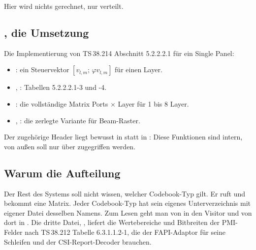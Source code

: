 Hier wird nichts gerechnet, nur verteilt.

\subsection{, die Umsetzung}

Die Implementierung von TS\,38.214 Abschnitt 5.2.2.2.1 für ein Single Panel:
\begin{itemize}
  \item {}: ein Steuervektor $[v_{l,m};\,\varphi v_{l,m}]$ für einen Layer.
  \item {}, : Tabellen 5.2.2.2.1-3 und -4.
  \item {}: die vollständige Matrix Ports $\times$ Layer für 1 bis 8 Layer.
  \item {}, : die zerlegte Variante für Beam-Raster.
\end{itemize}

Der zugehörige Header  liegt bewusst in  statt in
: Diese Funktionen sind intern, von außen soll nur über  zugegriffen werden.

\subsection{Warum die Aufteilung}

Der Rest des Systems soll nicht wissen, welcher Codebook-Typ gilt. Er ruft 
und bekommt eine Matrix. Jeder Codebook-Typ hat sein eigenes Unterverzeichnis mit eigener Datei desselben Namens.
Zum Lesen geht man von  in den Visitor und von dort in
. Die dritte Datei, ,
liefert die Wertebereiche und Bitbreiten der PMI-Felder nach TS\,38.212 Tabelle 6.3.1.1.2-1, die der FAPI-Adaptor
für seine Schleifen und der CSI-Report-Decoder brauchen.
